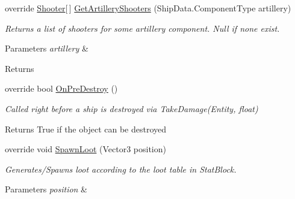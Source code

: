 \begin{DoxyCompactItemize}
\item 
\hypertarget{class_skyrates_1_1_client_1_1_entity_1_1_entity_player_ship_a05f762bd1722706fcafe61c9819e3613}{override \hyperlink{class_skyrates_1_1_client_1_1_mono_1_1_shooter}{Shooter}\mbox{[}$\,$\mbox{]} \hyperlink{class_skyrates_1_1_client_1_1_entity_1_1_entity_player_ship_a05f762bd1722706fcafe61c9819e3613}{Get\-Artillery\-Shooters} (Ship\-Data.\-Component\-Type artillery)}\label{class_skyrates_1_1_client_1_1_entity_1_1_entity_player_ship_a05f762bd1722706fcafe61c9819e3613}

\begin{DoxyCompactList}\small\item\em Returns a list of shooters for some artillery component. Null if none exist. 


\begin{DoxyParams}{Parameters}
{\em artillery} & \\
\hline
\end{DoxyParams}
\begin{DoxyReturn}{Returns}

\end{DoxyReturn}
 \end{DoxyCompactList}\item 
\hypertarget{class_skyrates_1_1_client_1_1_entity_1_1_entity_player_ship_a6ccbcb23466cd4cbe04b207dce57c818}{override bool \hyperlink{class_skyrates_1_1_client_1_1_entity_1_1_entity_player_ship_a6ccbcb23466cd4cbe04b207dce57c818}{On\-Pre\-Destroy} ()}\label{class_skyrates_1_1_client_1_1_entity_1_1_entity_player_ship_a6ccbcb23466cd4cbe04b207dce57c818}

\begin{DoxyCompactList}\small\item\em Called right before a ship is destroyed via Take\-Damage(\-Entity, float) 

\begin{DoxyReturn}{Returns}
True if the object can be destroyed
\end{DoxyReturn}
 \end{DoxyCompactList}\item 
\hypertarget{class_skyrates_1_1_client_1_1_entity_1_1_entity_player_ship_a8c476f6288ed5e7c370db774323dcedf}{override void \hyperlink{class_skyrates_1_1_client_1_1_entity_1_1_entity_player_ship_a8c476f6288ed5e7c370db774323dcedf}{Spawn\-Loot} (Vector3 position)}\label{class_skyrates_1_1_client_1_1_entity_1_1_entity_player_ship_a8c476f6288ed5e7c370db774323dcedf}

\begin{DoxyCompactList}\small\item\em Generates/\-Spawns loot according to the loot table in Stat\-Block. 


\begin{DoxyParams}{Parameters}
{\em position} & \\
\hline
\end{DoxyParams}
 \end{DoxyCompactList}\end{DoxyCompactItemize}

